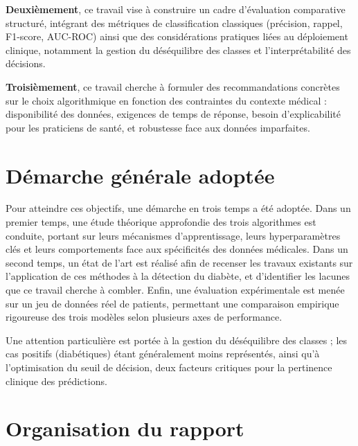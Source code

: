 \textbf{Deuxièmement}, ce travail vise à construire un cadre d'évaluation comparative structuré,
intégrant des métriques de classification classiques (précision, rappel, F1-score, AUC-ROC)
ainsi que des considérations pratiques liées au déploiement clinique, notamment la gestion
du déséquilibre des classes et l'interprétabilité des décisions.

\textbf{Troisièmement}, ce travail cherche à formuler des recommandations concrètes sur le
choix algorithmique en fonction des contraintes du contexte médical : disponibilité des
données, exigences de temps de réponse, besoin d'explicabilité pour les praticiens de
santé, et robustesse face aux données imparfaites.

\section*{Démarche générale adoptée}

Pour atteindre ces objectifs, une démarche en trois temps a été adoptée. Dans un
premier temps, une étude théorique approfondie des trois algorithmes est conduite, portant
sur leurs mécanismes d'apprentissage, leurs hyperparamètres clés et leurs comportements
face aux spécificités des données médicales. Dans un second temps, un état de l'art est
réalisé afin de recenser les travaux existants sur l'application de ces méthodes à la
détection du diabète, et d'identifier les lacunes que ce travail cherche à combler. Enfin,
une évaluation expérimentale est menée sur un jeu de données réel de patients, permettant
une comparaison empirique rigoureuse des trois modèles selon plusieurs axes de
performance.

Une attention particulière est portée à la gestion du déséquilibre des classes ; les cas positifs (diabétiques) étant généralement moins représentés, ainsi qu'à l'optimisation du seuil de décision, deux facteurs critiques pour la pertinence clinique des prédictions.

\section*{Organisation du rapport}

